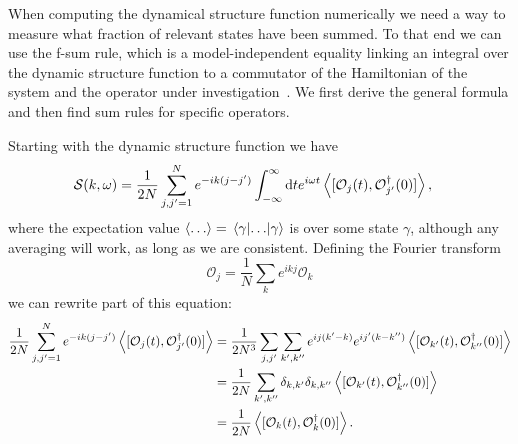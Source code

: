 \documentclass[11pt, a4paper]{report} %
\begin{document}
When computing the dynamical structure function numerically we need a way to measure what fraction of relevant states have been summed.
To that end we can use the f-sum rule, which is a model-independent equality linking an integral over the dynamic structure function to a commutator of the Hamiltonian of the system and the operator under investigation~\cite{pitaevskii}.
We first derive the general formula and then find sum rules for specific operators.

Starting with the dynamic structure function we have
\begin{align}
  	\mathcal{S}(k,\omega) &= \frac{1}{2N} \sum_{j,j'=1}^{N} e^{-ik(j-j')} \int_{-\infty}^{\infty}\dd t e^{i\omega t}\expval{[\mathcal{O}_j(t),\mathcal{O}_{j'}^{\dagger}(0)]},
\end{align}
where the expectation value \(\expval{\ldots} = \matrixel{\gamma}{\ldots}{\gamma}\) is over some state \(\gamma\), although any averaging will work, as long as we are consistent.
Defining the Fourier transform
\begin{equation}
  \mathcal{O}_j = \frac{1}{N} \sum_k e^{ikj} \mathcal{O}_k
\end{equation}
we can rewrite part of this equation:
\begin{align}
  \frac{1}{2N} \sum_{j,j'=1}^{N} e^{-ik(j-j')} \expval{[\mathcal{O}_j(t),\mathcal{O}_{j'}^{\dagger}(0)]} &= \frac{1}{2N^3} \sum_{j, j'}\sum_{k',k''} e^{ij(k'-k)}e^{ij'(k-k'')}  \expval{[\mathcal{O}_{k'}(t),\mathcal{O}_{k''}^{\dagger}(0)]}\\
&= \frac{1}{2N} \sum_{k',k''} \delta_{k,k'}\delta_{k,k''}  \expval{[\mathcal{O}_{k'}(t),\mathcal{O}_{k''}^{\dagger}(0)]} \\
&= \frac{1}{2N}  \expval{[\mathcal{O}_{k}(t),\mathcal{O}_{k}^{\dagger}(0)]}.
\end{align}
\end{document}
